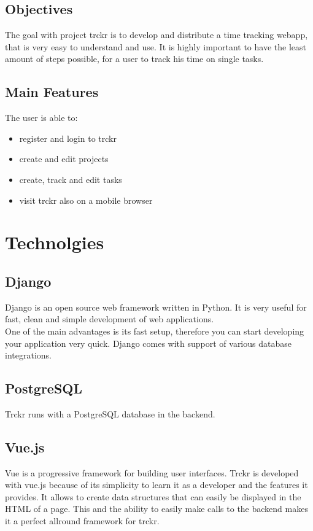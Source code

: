 \documentclass[a4paper, 12pt, headsepline]{scrartcl}
\begin{document}
\subsection{Objectives}
The goal with project trckr is to develop and distribute a time tracking webapp, that is very easy to understand and use. It is highly important to
have the least amount of steps possible, for a user to track his time on single tasks.

\subsection{Main Features}
The user is able to:
\begin{itemize}
    \item register and login to trckr
    \item create and edit projects
    \item create, track and edit tasks
    \item visit trckr also on a mobile browser
\end{itemize}


\section{Technolgies}


\subsection{Django}
Django is an open source web framework written in Python. It is very useful for fast, clean and simple development of web applications.\\
One of the main advantages is its fast setup, therefore you can start developing your application very quick.
Django comes with support of various database integrations.

\subsection{PostgreSQL}
Trckr runs with a PostgreSQL database in the backend.

\subsection{Vue.js}
Vue is a progressive framework for building user interfaces. Trckr is developed with vue.js because of its simplicity to learn it as a developer and the features it provides.
It allows to create data structures that can easily be displayed in the HTML of a page. This and the ability to easily make calls to the backend makes it a perfect allround framework for trckr. 
\end{document}
